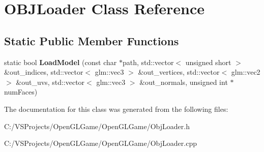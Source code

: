 \hypertarget{class_o_b_j_loader}{\section{O\-B\-J\-Loader Class Reference}
\label{class_o_b_j_loader}
}
\subsection*{Static Public Member Functions}
\begin{DoxyCompactItemize}
\item 
\hypertarget{class_o_b_j_loader_a580875089ff49629b8fc2e31171e0cec}{static bool {\bfseries Load\-Model} (const char $\ast$path, std\-::vector$<$ unsigned short $>$ \&out\-\_\-indices, std\-::vector$<$ glm\-::vec3 $>$ \&out\-\_\-vertices, std\-::vector$<$ glm\-::vec2 $>$ \&out\-\_\-uvs, std\-::vector$<$ glm\-::vec3 $>$ \&out\-\_\-normals, unsigned int $\ast$num\-Faces)}\label{class_o_b_j_loader_a580875089ff49629b8fc2e31171e0cec}

\end{DoxyCompactItemize}


The documentation for this class was generated from the following files\-:\begin{DoxyCompactItemize}
\item 
C\-:/\-V\-S\-Projects/\-Open\-G\-L\-Game/\-Open\-G\-L\-Game/Obj\-Loader.\-h\item 
C\-:/\-V\-S\-Projects/\-Open\-G\-L\-Game/\-Open\-G\-L\-Game/Obj\-Loader.\-cpp\end{DoxyCompactItemize}
